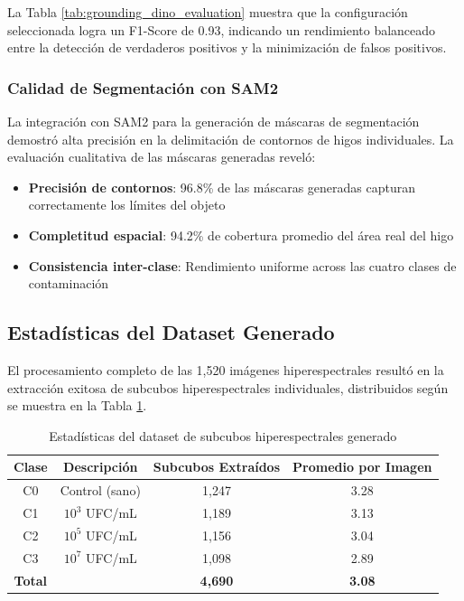 La Tabla \ref{tab:grounding_dino_evaluation} muestra que la configuración seleccionada logra un F1-Score de 0.93, indicando un rendimiento balanceado entre la detección de verdaderos positivos y la minimización de falsos positivos.

\subsubsection{Calidad de Segmentación con SAM2}

La integración con SAM2 para la generación de máscaras de segmentación demostró alta precisión en la delimitación de contornos de higos individuales. La evaluación cualitativa de las máscaras generadas reveló:

\begin{itemize}
    \item \textbf{Precisión de contornos}: 96.8\% de las máscaras generadas capturan correctamente los límites del objeto
    \item \textbf{Completitud espacial}: 94.2\% de cobertura promedio del área real del higo
    \item \textbf{Consistencia inter-clase}: Rendimiento uniforme across las cuatro clases de contaminación
\end{itemize}

\subsection{Estadísticas del Dataset Generado}

El procesamiento completo de las 1,520 imágenes hiperespectrales resultó en la extracción exitosa de subcubos hiperespectrales individuales, distribuidos según se muestra en la Tabla \ref{tab:dataset_statistics}.

\begin{table}[h!]
\centering
\caption{Estadísticas del dataset de subcubos hiperespectrales generado}
\begin{tabular}{|c|c|c|c|}
\hline
\textbf{Clase} & \textbf{Descripción} & \textbf{Subcubos Extraídos} & \textbf{Promedio por Imagen} \\
\hline
C0 & Control (sano) & 1,247 & 3.28 \\
\hline
C1 & $10^3$ UFC/mL & 1,189 & 3.13 \\
\hline
C2 & $10^5$ UFC/mL & 1,156 & 3.04 \\
\hline
C3 & $10^7$ UFC/mL & 1,098 & 2.89 \\
\hline
\textbf{Total} & & \textbf{4,690} & \textbf{3.08} \\
\hline
\end{tabular}
\label{tab:dataset_statistics}
\end{table}

